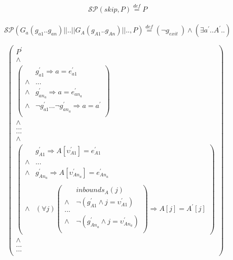 \documentclass[a4paper,10pt]{article}
\newcommand{\p}[1]{\ensuremath{#1^{'}}\xspace}
\newcommand{\gexit}{\ensuremath{\mathit{g_{exit}~}}}
\newcommand{\inbounds}[2]{\ensuremath{\mathit{inbounds}_{#1}(#2)}\xspace}
\newcommand{\group}[2]{\ensuremath{\mathit{G}_{#1}(#2)}\xspace}
\newcommand{\symdef}{\ensuremath{\overset{\mathit{def}}{=}}}
\newcommand{\impl}{\ensuremath{\Longrightarrow}}
\newcommand{\spostsym}{\ensuremath{\mathcal{SP}}\xspace}
\newcommand{\spost}[2]{\ensuremath{\spostsym(#1,#2)}}
\begin{document}
\begin{eqnarray*}
    && \spost{skip}{P} \symdef P  
\end{eqnarray*}

\begin{eqnarray*}
    && \spost{\group{a}{g_{a1} .. g_{an}} || .. || \group{A}{g_{A1} .. g_{An}} || ..}{P} \symdef 
   (\neg \gexit) \land (\exists \p{a}..\p{A}..)\\
    &&~~~\\
    &&\begin{array}{cc}  
        \left(\begin{array}{cc}
                \p{P}\\
                \land\\                             
                \left(\begin{array}{cc}
                & \p{g_{a1}} \impl a = \p{e_{a1}} \\
                \land & ...\\
                \land & \p{g_{an_a}} \impl a = \p{e_{an_a}}\\
                \land & \neg \p{g_{a1}} ... \neg \p{g_{an_a}} \impl a = \p{a}\\
              \end{array}\right)\\
              \land\\
              ...\\
              ...\\
              \land\\ 
              \left(\begin{array}{cc}
                & \p{g_{A1}} \impl A[\p{\upsilon_{A1}}] = \p{e_{A1}} \\
                \land & ...\\
                \land & \p{g_{An_a}} \impl A[\p{\upsilon_{An_a}}] = \p{e_{An_a}}\\
                &~~~~~~~~~~~~~~~~\\
                \land & (\forall j)
              \left(\begin{array}{cc}
                &\inbounds{A}{j} \\
                \land & \neg (\p{g_{A1}} \land j =  \p{\upsilon_{A1}})\\
                ...\\
                \land & \neg (\p{g_{An_a}} \land j =  \p{\upsilon_{An_a}})\\
                \end{array}\right) \impl A[j] = \p{A}[j]
              \end{array}\right)\\   
              \land\\
              ...\\
              ...\\
        \end{array}\right)
    \end{array}
\end{eqnarray*}
\end{document}
